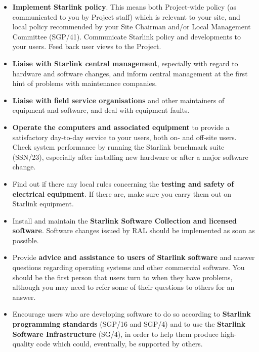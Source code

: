 \documentclass[twoside,11pt]{article}
\newcommand{\xref}[3]{#1}
\begin{document}
\begin{itemize}

\item {\bf Implement Starlink policy}.
This means both Project-wide policy (as communicated to you by Project staff)
which is relevant to your site, and local policy recommended by your Site
Chairman and/or Local Management Committee
(\xref{SGP/41}{sgp41}{}).
Communicate Starlink policy and developments to your users.
Feed back user views to the Project.

\item {\bf Liaise with Starlink central management}, especially with regard to
hardware and software changes, and inform central management at the first hint
of problems with maintenance companies. 

\item {\bf Liaise with field service organisations} and other
maintainers of equipment and software, and deal with equipment faults.

\item {\bf Operate the computers and associated equipment} to provide a
satisfactory day-to-day service to your users, both on- and off-site users.
Check system performance by running the Starlink benchmark suite
(\xref{SSN/23}{ssn23}{}),
especially after installing new hardware or after a major software change.

\item Find out if there any local rules concerning the {\bf testing and safety
of electrical equipment}.
If there are, make sure you carry them out on Starlink equipment.

\item Install and maintain the {\bf Starlink Software Collection and licensed
software}.
Software changes issued by RAL should be implemented as soon as possible.

\item Provide {\bf advice and assistance to users of Starlink software} and
answer questions regarding operating systems and other commercial software.
You should be the first person that users turn to when they have problems,
although you may need to refer some of their questions to others for an
answer.

\item Encourage users who are developing software to do so according to
{\bf Starlink programming standards}
(\xref{SGP/16}{sgp16}{} and
\xref{SGP/4}{sgp4}{}) and to use the {\bf Starlink Software Infrastructure}
(\xref{SG/4}{sg4}{}), in order to help them produce
high-quality code which could, eventually, be supported by others.


\end{itemize}
\end{document}
